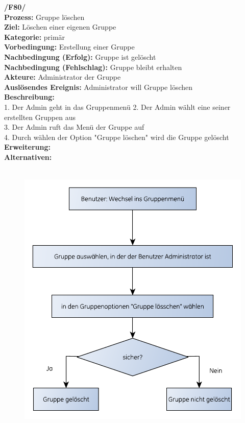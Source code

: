 \textbf{/F80/} \\
\textbf{Prozess:} Gruppe löschen \\
\textbf{Ziel:} Löschen einer eigenen Gruppe \\
\textbf{Kategorie:} primär \\
\textbf{Vorbedingung:} Erstellung einer Gruppe \\
\textbf{Nachbedingung (Erfolg):} Gruppe ist gelöscht\\
\textbf{Nachbedingung (Fehlschlag):} Gruppe bleibt erhalten\\
\textbf{Akteure:} Administrator der Gruppe \\
\textbf{Auslösendes Ereignis:} Administrator will Gruppe löschen\\
\textbf{Beschreibung:} \\
1. Der Admin geht in das Gruppenmenü
2. Der Admin wählt eine seiner erstellten Gruppen aus \\
3. Der Admin ruft das Menü der Gruppe auf \\
4. Durch wählen der Option "Gruppe löschen" wird die Gruppe gelöscht \\
\textbf{Erweiterung:} \\
\textbf{Alternativen:} \\
\\
\begin{figure}[H]
	\centering
	\includegraphics[scale=0.8]{./res/F80_gruppe_loeschen_flowgraph.pdf}
\end{figure}

